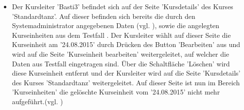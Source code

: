 \documentclass[a4paper]{scrreprt}
\begin{document}
\begin{itemize}
			\item {}
			Der Kursleiter 'Basti3' befindet sich auf der Seite 'Kursdetails' des Kurses 'Standardtanz'. Auf dieser befinden sich bereits die durch den Systemadministrator angegebenen Daten (vgl. ), sowie die angelegten Kurseinheiten aus dem Testfall . Der Kursleiter wählt auf dieser Seite die Kurseinheit am '24.08.2015' durch Drücken des Button 'Bearbeiten' aus und wird auf die Seite 'Kurseinheit bearbeiten' weitergeleitet, auf welcher die Daten aus Testfall  eingetragen sind. Über die Schaltfläche 'Löschen' wird diese Kurseinheit entfernt und der Kursleiter wird auf die Seite 'Kursdetails' des Kurses 'Standardtanz' weitergeleitet. Auf dieser Seite ist nun im Bereich 'Kurseinheiten' die gelöschte Kurseinheit vom '24.08.2015' nicht mehr aufgeführt.(vgl. )			
		\end{itemize}
			
\end{document}
